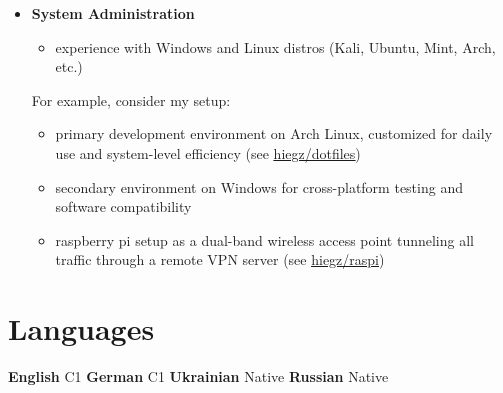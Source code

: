 \documentclass[]{article}
\begin{document}
\begin{minipage}[t]{0.49\linewidth}
    \begin{itemize}[leftmargin=0.15in, rightmargin=0.15in, label={}]
        \item {\large\bfseries System Administration}

            \begin{itemize}
                \item experience with Windows and Linux distros (Kali, Ubuntu, Mint, Arch, etc.)
            \end{itemize}

            \hspace{5pt}
            For example, consider my setup:

            \begin{itemize}
                \item primary development environment on Arch Linux, customized
                    for daily use and system-level efficiency (see
                    \href{https://github.com/hiegz/dotfiles}{\ttfamily \underline{hiegz/dotfiles}})
                \item secondary environment on Windows for cross-platform
                    testing and software compatibility
                \item raspberry pi setup as a dual-band wireless access
                    point tunneling all traffic through a remote VPN server
                    (see \href{https://github.com/hiegz/raspi}{\ttfamily
                    \underline{hiegz/raspi}})
            \end{itemize}
    \end{itemize}
\end{minipage}

\vspace{5pt}
\section{Languages}

\hspace{0.15in}
\textbf{English} \:  C1 \hspace{20pt} \textbf{German} \: C1 \hspace{20pt} \textbf{Ukrainian} \: Native \hspace{20pt} \textbf{Russian} \: Native
\end{document}

